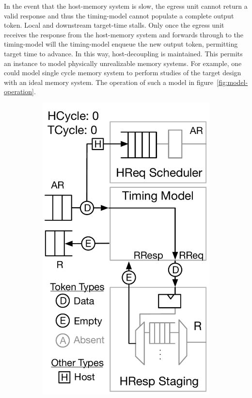 In the event that the host-memory system is slow, the egress unit cannot return
a valid response and thus the timing-model cannot populate a complete output
token. Local and downstream target-time stalls. Only once the egress unit
receives the response from the host-memory system and forwards through to the
timing-model will the timing-model enqueue the new output token, permitting
target time to advance.  In this way, host-decoupling is maintained. This
permits an instance to model physically unrealizable memory systems. For
example, one could model single cycle memory system to perform studies of the
target design with an ideal memory system. The operation of such a model in
figure~\ref{fig:model-operation}.

\begin{figure}
	\centering
    \begin{subfigure}[t]{0.23\textwidth}
        \includegraphics[width=\columnwidth]{figures/model-operation-1.pdf}

\end{subfigure}
\end{figure}
